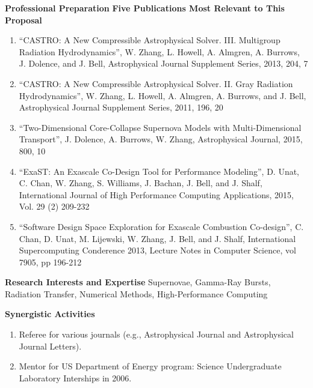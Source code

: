 \documentclass[11pt,letterpaper,english]{article}
\begin{document}
\begin{flushleft} {\bf Professional Preparation}
\vspace{.04in}
{\bf Five Publications Most Relevant to This Proposal}
\vspace{-6pt}
\begin{enumerate} \itemsep1pt \parskip0pt 
\item ``CASTRO: A New Compressible Astrophysical
  Solver. III. Multigroup Radiation Hydrodynamics'', W. Zhang,
  L. Howell, A. Almgren, A. Burrows, J. Dolence, and J. Bell,
  Astrophysical Journal Supplement Series, 2013,
  204, 7\\
\item ``CASTRO: A New Compressible Astrophysical Solver. II. Gray
  Radiation Hydrodynamics'', W. Zhang, L. Howell, A. Almgren,
  A. Burrows, and J. Bell, Astrophysical Journal Supplement Series,
  2011, 196, 20\\ 
\item ``Two-Dimensional Core-Collapse Supernova Models with
  Multi-Dimensional Transport'', J. Dolence, A. Burrows, W. Zhang,
  Astrophysical Journal, 2015, 800, 10\\
\item ``ExaST: An Exascale Co-Design Tool for Performance Modeling'',
  D. Unat, C. Chan, W. Zhang, S. Williams, J. Bachan, J. Bell, and
  J. Shalf, International Journal of High Performance Computing
  Applications, 2015, Vol. 29 (2) 209-232\\
\item ``Software Design Space Exploration for Exascale Combustion
  Co-design'', C. Chan, D. Unat, M. Lijewski, W. Zhang, J. Bell, and
  J. Shalf, International Supercomputing Conderence 2013, Lecture
  Notes in Computer Science, vol 7905, pp 196-212
\end{enumerate} 

\vspace{-6pt}
{\bf Research Interests and Expertise}
{\parindent 16pt
Supernovae, Gamma-Ray Bursts, Radiation Transfer, Numerical Methods,
High-Performance Computing
}


\vspace{.04in}
{\bf Synergistic Activities}
\vspace{-6pt}
\begin{enumerate} \itemsep1pt \parskip0pt 
\item Referee for various journals
  (e.g., Astrophysical Journal and Astrophysical Journal Letters).
\item Mentor for US Department of Energy program: Science
  Undergraduate Laboratory Interships in 2006.
\end{enumerate} 


\end{flushleft}
\end{document}
